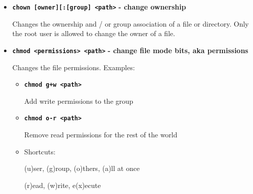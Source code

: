 \documentclass[aspectratio=1610]{beamer}
\newcommand\curtitle{}
\newenvironment{shells}[1]{
    \begin{tikzpicture}[codebox/.append style={text width=#1-18pt}]
        \coordinate (code);
}{
    \end{tikzpicture}
}
\newcommand\command[1]{\alert{\textbf{\texttt{#1}}}}
\begin{document}

\begin{frame}[c]{\curtitle}
    \begin{itemize}[<+->]\setlength\itemsep{1em}
        \item \command{chown [owner][:[group] <path>} \textbf{- change ownership} 


            Changes the ownership and / or group association of a file or directory. Only the
            \alert{root} user is allowed to change the owner of a file.

        \item \command{chmod <permissions> <path>} \textbf{- change file mode bits, aka permissions} 

            Changes the file permissions. Examples:
            \begin{itemize}[<.->]
                \item \command{chmod g+w <path>}

                    Add write permissions to the group
                \item \command{chmod o-r <path>}

                    Remove read permissions for the rest of the world
                \item Shortcuts:

                    (u)ser, (g)roup, (o)thers, (a)ll at once

                    (r)ead, (w)rite, e(x)ecute
            \end{itemize}
    \end{itemize}
\end{frame}


\end{document}
